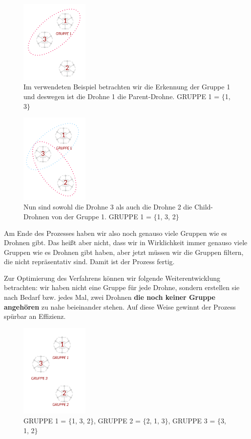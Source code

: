 \documentclass[a4paper,titlepage,onecolumn,twoside,12pt]{article}
\begin{document}
\begin{figure}
\centering
\includegraphics[width = 0.3\textwidth]{gruppenerkennung2}
\caption{Im verwendeten Beispiel betrachten wir die Erkennung der Gruppe 1 und deswegen ist die Drohne 1 die Parent-Drohne. GRUPPE 1 = $ \{ $1, 3$ \} $}
\label{fig:gruppenerkennung2}
\end{figure}

\begin{figure}
\centering
\includegraphics[width = 0.3\textwidth]{gruppenerkennung3}
\caption{Nun sind sowohl die Drohne 3 als auch die Drohne 2 die Child-Drohnen von der Gruppe 1. GRUPPE 1 = $ \{ $1, 3, 2$ \} $}
\label{fig:gruppenerkennung3}
\end{figure}

Am Ende des Prozesses haben wir also noch genauso viele Gruppen wie es Drohnen gibt. Das heißt aber nicht, dass wir in Wirklichkeit immer genauso viele Gruppen wie es Drohnen gibt haben, aber jetzt müssen wir die Gruppen filtern, die nicht repräsentativ sind. Damit ist der Prozess fertig.

Zur Optimierung des Verfahrens können wir folgende Weiterentwicklung betrachten: wir haben nicht eine Gruppe für jede Drohne, sondern erstellen sie nach Bedarf bzw. jedes Mal, zwei Drohnen \textbf{die noch keiner Gruppe angehören} zu nahe beieinander stehen. Auf diese Weise gewinnt der Prozess spürbar an Effizienz.
\begin{figure}
\centering
\includegraphics[width = 0.3\textwidth]{gruppenerkennung5}
\caption{GRUPPE 1 = $ \{ $1, 3, 2$ \} $, GRUPPE 2 = $ \{ $2, 1, 3$ \} $, GRUPPE 3 = $ \{ $3, 1, 2$ \} $}
\label{fig:gruppenerkennung5}
\end{figure}
\end{document}
